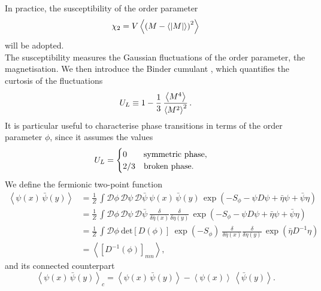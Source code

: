 In practice, the susceptibility of the order parameter 
\begin{equation}
    \chi_2 = V \left\langle \left(M-\left\langle |M| \right\rangle\right)^2 \right\rangle
    \label{eq:abs_susceptibility}
\end{equation}
will be adopted. \\
The susceptibility measures the Gaussian fluctuations of the order parameter, the magnetisation. We then introduce the Binder cumulant \cite{binder2010monte}, which quantifies the curtosis of the fluctuations
\begin{equation*}
    U_L \equiv 1 - \frac{1}{3} \, \frac{\left\langle M^4 \right\rangle}{\left\langle M^2 \right\rangle^2} \, .
\end{equation*}
It is particular useful to characterise phase transitions in terms of the order parameter $\phi$, since it assumes the values 
\begin{equation*}
    U_L = \begin{cases}0 \quad \hphantom{/3} \text{symmetric phase}, \\ 2/3 \quad \text{broken phase}. \end{cases}
\end{equation*}
We define the fermionic two-point function
\begin{equation} 
\begin{aligned}
    \left\langle \psi(x) \, \bar\psi(y) \right\rangle 
    &= \frac{1}{Z} \, \int \mathcal{D}\phi \, \mathcal{D}\psi \, \mathcal{D}\bar\psi \ \psi(x) \, \bar\psi(y) \, \exp \left( - S_\phi - \psi D \psi + \bar\eta \psi + \bar \psi \eta \right) \\
    &= \frac{1}{Z} \, \int \mathcal{D}\phi \, \mathcal{D}\psi \, \mathcal{D}\bar\psi \ \frac{\delta}{\delta \bar \eta(x)} \frac{\delta}{\delta \eta(y)} \, \exp \left( - S_\phi - \psi D \psi + \bar\eta \psi + \bar \psi \eta \right) \\
    &= \frac{1}{Z} \, \int \mathcal{D}\phi \ \text{det}\left[D(\phi)\right] \ \exp \left( - S_\phi \right) \ \frac{\delta}{\delta \bar \eta(x)} \frac{\delta}{\delta \eta(y)} \, \exp\left( \bar\eta D^{-1} \eta \right) \\
    &= \left\langle \left[D^{-1}(\phi)\right]_{mn}\right\rangle,
\end{aligned}
\label{eq:D_inv_condensate}
\end{equation}
and its connected counterpart
\begin{equation*}
    \left\langle \psi(x) \, \bar\psi(y) \right\rangle_c = \left\langle \psi(x) \, \bar\psi(y) \right\rangle  - \left\langle \psi(x) \right\rangle \, \left\langle\bar\psi(y) \right\rangle .
\end{equation*}
